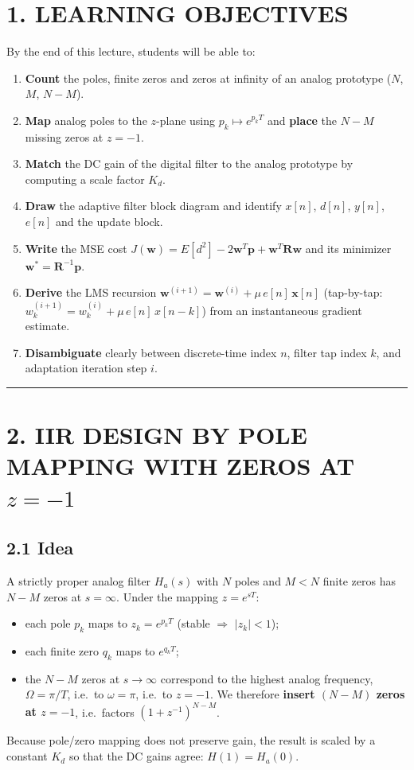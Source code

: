 \documentclass[11pt,a4paper]{article}
\begin{document}
\section{1. LEARNING OBJECTIVES}
By the end of this lecture, students will be able to:
\begin{enumerate}
    \item \textbf{Count} the poles, finite zeros and zeros at infinity of an analog prototype ($N$, $M$, $N-M$).
    \item \textbf{Map} analog poles to the $z$-plane using $p_k \mapsto e^{p_k T}$ and \textbf{place} the $N-M$ missing zeros at $z=-1$.
    \item \textbf{Match} the DC gain of the digital filter to the analog prototype by computing a scale factor $K_d$.
    \item \textbf{Draw} the adaptive filter block diagram and identify $x[n]$, $d[n]$, $y[n]$, $e[n]$ and the update block.
    \item \textbf{Write} the MSE cost $J(\mathbf{w}) = E[d^2] - 2\mathbf{w}^T\mathbf{p} + \mathbf{w}^T\mathbf{R}\mathbf{w}$ and its minimizer $\mathbf{w}^\ast = \mathbf{R}^{-1}\mathbf{p}$.
    \item \textbf{Derive} the LMS recursion $\mathbf{w}^{(i+1)} = \mathbf{w}^{(i)} + \mu\, e[n]\,\mathbf{x}[n]$ (tap-by-tap: $w_k^{(i+1)} = w_k^{(i)} + \mu\, e[n]\, x[n-k]$) from an instantaneous gradient estimate.
    \item \textbf{Disambiguate} clearly between discrete-time index $n$, filter tap index $k$, and adaptation iteration step $i$.
\end{enumerate}

\noindent\rule{\textwidth}{0.5pt}

\section{2. IIR DESIGN BY POLE MAPPING WITH ZEROS AT $z=-1$}

\subsection{2.1 Idea}
A strictly proper analog filter $H_a(s)$ with $N$ poles and $M < N$ finite zeros has $N-M$ zeros at $s=\infty$. Under the mapping $z = e^{sT}$:
\begin{itemize}
    \item each pole $p_k$ maps to $z_k = e^{p_k T}$ (stable $\Rightarrow$ $|z_k|<1$);
    \item each finite zero $q_k$ maps to $e^{q_k T}$;
    \item the $N-M$ zeros at $s \to \infty$ correspond to the highest analog frequency, $\Omega = \pi/T$, i.e.\ to $\omega = \pi$, i.e.\ to $z=-1$. We therefore \textbf{insert $(N-M)$ zeros at $z=-1$}, i.e.\ factors $(1+z^{-1})^{N-M}$.
\end{itemize}
Because pole/zero mapping does not preserve gain, the result is scaled by a constant $K_d$ so that the DC gains agree: $H(1) = H_a(0)$.
\end{document}
